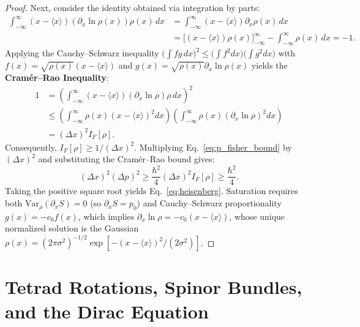 \documentclass[11pt, a4paper]{article}
\theoremstyle{definition}
\begin{document}
\begin{proof}
Next, consider the identity obtained via integration by parts:
\begin{equation}
\begin{aligned}
\int_{-\infty}^{\infty} (x - \langle x \rangle) \left( \partial_x \ln \rho(x) \right) \rho(x) \, dx &= \int_{-\infty}^{\infty} (x - \langle x \rangle) \partial_x \rho(x) \, dx \\
&= \Big[ (x - \langle x \rangle)\rho(x) \Big]_{-\infty}^{\infty} - \int_{-\infty}^{\infty} \rho(x)\,dx = -1.
\end{aligned}
\end{equation}
Applying the Cauchy--Schwarz inequality $\big(\int f g \, dx\big)^2 \le \big(\int f^2 dx\big)\allowbreak\big(\int g^2 dx\big)$ with $f(x) = \sqrt{\rho(x)}(x - \langle x \rangle)$ and $g(x) = \sqrt{\rho(x)}\partial_x \ln\rho(x)$ yields the \textbf{Cram\'{e}r--Rao Inequality}:
\begin{equation}
\label{eq:cramer_rao}
\begin{aligned}
1 &= \left( \int_{-\infty}^{\infty} (x - \langle x \rangle)(\partial_x \ln\rho)\rho \, dx \right)^2 \\
&\le \left( \int_{-\infty}^{\infty} \rho(x)(x - \langle x \rangle)^2 dx \right) \left( \int_{-\infty}^{\infty} \rho(x)(\partial_x \ln\rho)^2 dx \right) \\
&= (\Delta x)^2 I_F[\rho].
\end{aligned}
\end{equation}
Consequently, $I_F[\rho] \ge 1 / (\Delta x)^2$. Multiplying Eq.~\eqref{eq:p_fisher_bound} by $(\Delta x)^2$ and substituting the Cram\'{e}r--Rao bound gives:
\begin{equation}
(\Delta x)^2 (\Delta p)^2 \ge \frac{\hbar^2}{4} (\Delta x)^2 I_F[\rho] \ge \frac{\hbar^2}{4}.
\end{equation}
Taking the positive square root yields Eq.~\eqref{eq:heisenberg}. Saturation requires both $\text{Var}_\rho(\partial_x S) = 0$ (so $\partial_x S = p_0$) and Cauchy--Schwarz proportionality $g(x) = -c_0 f(x)$, which implies $\partial_x \ln\rho = -c_0(x - \langle x \rangle)$, whose unique normalized solution is the Gaussian $\rho(x) = (2\pi\sigma^2)^{-1/2} \exp[-(x-\langle x \rangle)^2/(2\sigma^2)]$.
\end{proof}

\section{\texorpdfstring{Tetrad Rotations, Spinor Bundles, and the Dirac Equation}{Tetrad Rotations, Spinor Bundles, and the Dirac Equation}}
\label{sec:spinor}
\end{document}

